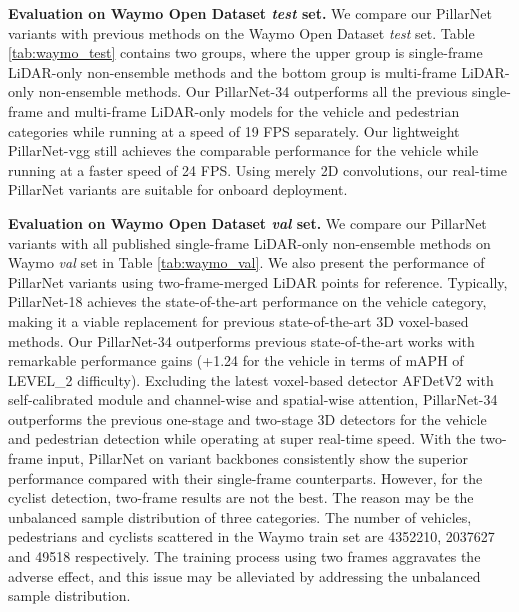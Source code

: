 \documentclass[runningheads]{llncs}
\begin{document}
{\flushleft \bf Evaluation on Waymo Open Dataset \textit{test} set.}
We compare our PillarNet variants with previous methods on the Waymo Open Dataset \textit{test} set.
Table \ref{tab:waymo_test} contains two groups, where the upper group is single-frame LiDAR-only non-ensemble methods and the bottom group is multi-frame LiDAR-only non-ensemble methods.
Our PillarNet-34 outperforms all the previous single-frame and multi-frame LiDAR-only models for the vehicle and pedestrian categories while running at a speed of 19 FPS separately.
Our lightweight PillarNet-vgg still achieves the comparable performance for the vehicle while running at a faster speed of 24 FPS. 
Using merely 2D convolutions, our real-time PillarNet variants are suitable for onboard deployment.

{\flushleft \bf Evaluation on Waymo Open Dataset \textit{val} set.}
We compare our PillarNet variants with all published single-frame LiDAR-only non-ensemble methods on Waymo \textit{val} set in Table \ref{tab:waymo_val}. We also present the performance of PillarNet variants using two-frame-merged LiDAR points for reference.
Typically, PillarNet-18 achieves the state-of-the-art performance on the vehicle category, making it a viable replacement for previous state-of-the-art 3D voxel-based methods.
Our PillarNet-34 outperforms previous state-of-the-art works with remarkable performance gains (+1.24 for the vehicle in terms of mAPH of LEVEL\_2 difficulty).
Excluding the latest voxel-based detector AFDetV2 with self-calibrated module and channel-wise and spatial-wise attention, PillarNet-34 outperforms the previous one-stage and two-stage 3D detectors for the vehicle and pedestrian detection while operating at super real-time speed.
With the two-frame input, PillarNet on variant backbones consistently show the superior performance compared with their single-frame counterparts. However, for the cyclist detection, two-frame results are not the best. The reason may be the unbalanced sample distribution of three categories. 
The number of vehicles, pedestrians and cyclists scattered in the Waymo train set are 4352210, 2037627 and 49518 respectively.
The training process using two frames aggravates the adverse effect, and this  issue may be alleviated by addressing the unbalanced sample distribution.
\end{document}
